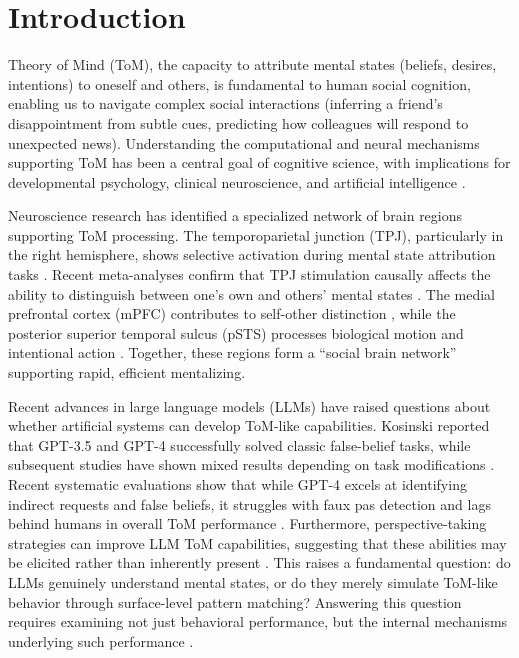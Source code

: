 \documentclass[conference]{IEEEtran}
\begin{document}
\section{Introduction}

Theory of Mind (ToM), the capacity to attribute mental states (beliefs, desires, intentions) to oneself and others, is fundamental to human social cognition, enabling us to navigate complex social interactions (inferring a friend's disappointment from subtle cues, predicting how colleagues will respond to unexpected news). Understanding the computational and neural mechanisms supporting ToM has been a central goal of cognitive science, with implications for developmental psychology, clinical neuroscience, and artificial intelligence \cite{frith2006neural, saxe2013people}.

Neuroscience research has identified a specialized network of brain regions supporting ToM processing. The temporoparietal junction (TPJ), particularly in the right hemisphere, shows selective activation during mental state attribution tasks \cite{saxe2013people, strachan2024testing}. Recent meta-analyses confirm that TPJ stimulation causally affects the ability to distinguish between one's own and others' mental states \cite{soutschek2025causal}. The medial prefrontal cortex (mPFC) contributes to self-other distinction \cite{amodio2006meeting}, while the posterior superior temporal sulcus (pSTS) processes biological motion and intentional action \cite{allison2000social}. Together, these regions form a ``social brain network'' \cite{mar2011neural} supporting rapid, efficient mentalizing.

Recent advances in large language models (LLMs) have raised questions about whether artificial systems can develop ToM-like capabilities. Kosinski \cite{kosinski2024evaluating} reported that GPT-3.5 and GPT-4 successfully solved classic false-belief tasks, while subsequent studies have shown mixed results depending on task modifications \cite{ullman2023large, shapira2024clever}. Recent systematic evaluations show that while GPT-4 excels at identifying indirect requests and false beliefs, it struggles with faux pas detection and lags behind humans in overall ToM performance \cite{strachan2024testing, chen2024tombench}. Furthermore, perspective-taking strategies can improve LLM ToM capabilities, suggesting that these abilities may be elicited rather than inherently present \cite{wilf2024think}. This raises a fundamental question: do LLMs genuinely understand mental states, or do they merely simulate ToM-like behavior through surface-level pattern matching? Answering this question requires examining not just behavioral performance, but the internal mechanisms underlying such performance \cite{sap2022neural, marcus2023large}.
\end{document}
